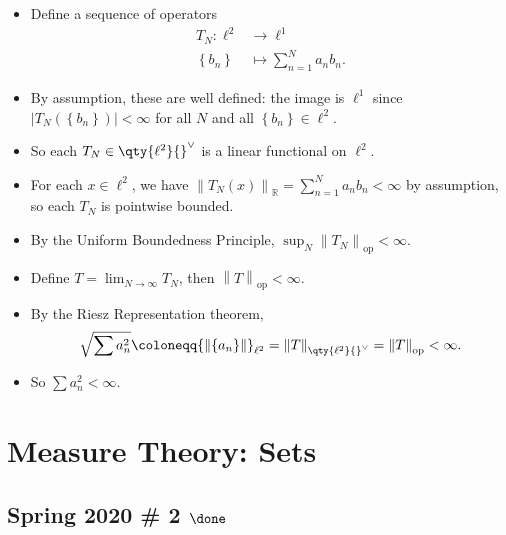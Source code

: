 \begin{solution}

\envlist

\begin{itemize}
\item
  Define a sequence of operators
  \begin{align*}  
  T_N: \ell^2 &\to \ell^1\\
  \left\{{b_n}\right\} &\mapsto \sum_{n=1}^N a_n b_n
  .\end{align*}
\item
  By assumption, these are well defined: the image is \(\ell^1\) since
  \({\left\lvert {T_N(\left\{{b_n}\right\})} \right\rvert} < \infty\)
  for all \(N\) and all \(\left\{{b_n}\right\} \in \ell^2\).
\item
  So each \(T_N \in \qty{\ell^2} {}^{ \vee }\) is a linear functional on
  \(\ell^2\).
\item
  For each \(x\in \ell^2\), we have
  \({\left\lVert {T_N(x)} \right\rVert}_{{\mathbb{R}}} = \sum_{n=1}^N a_n b_n < \infty\)
  by assumption, so each \(T_N\) is pointwise bounded.
\item
  By the Uniform Boundedness Principle,
  \(\sup_N {\left\lVert {T_N} \right\rVert}_{\text{op}} < \infty\).
\item
  Define \(T = \lim_{N \to\infty } T_N\), then
  \({\left\lVert {T} \right\rVert}_{\text{op}} < \infty\).
\item
  By the Riesz Representation theorem,
  \begin{align*}  
  \sqrt{\sum a_n^2} \coloneqq{\left\lVert {\left\{{a_n}\right\}} \right\rVert}_{\ell^2} = {\left\lVert {T} \right\rVert}_{\qty{\ell^2} {}^{ \vee }} = {\left\lVert {T} \right\rVert}_{\text{op}} < \infty
  .\end{align*}
\item
  So \(\sum a_n^2 < \infty\).
\end{itemize}

\end{solution}

\hypertarget{measure-theory-sets}{%
\section{Measure Theory: Sets}\label{measure-theory-sets}}

\hypertarget{spring-2020-2-done}{%
\subsection{\texorpdfstring{Spring 2020 \# 2
\(\done\)}{Spring 2020 \# 2 \textbackslash done}}\label{spring-2020-2-done}}

